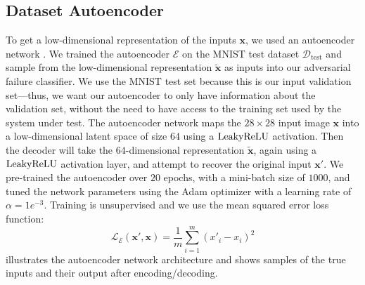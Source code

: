 \subsection{Dataset Autoencoder}\label{sec:autoencoder}
To get a low-dimensional representation of the inputs $\mathbf{x}$, we used an autoencoder network \citep{kramer1991nonlinear}.
We trained the autoencoder $\mathcal{E}$ on the MNIST test dataset $\mathcal{D}_\text{test}$ and sample from the low-dimensional representation $\tilde{\mathbf{x}}$ as inputs into our adversarial failure classifier.
We use the MNIST test set because this is our input validation set---thus, we want our autoencoder to only have information about the validation set, without the need to have access to the training set used by the system under test.
The autoencoder network maps the $28\times28$ input image $\mathbf x$ into a low-dimensional latent space of size $64$ using a $\operatorname{LeakyReLU}$ activation.
Then the decoder will take the $64$-dimensional representation $\mathbf{\tilde x}$, again using a $\operatorname{LeakyReLU}$ activation layer, and attempt to recover the original input $\mathbf x'$.
We pre-trained the autoencoder over $20$ epochs, with a mini-batch size of $1000$, and tuned the network parameters using the Adam optimizer with a learning rate of $\alpha=1e^{-3}$.
Training is unsupervised and we use the mean squared error loss function:
\begin{equation*}
\mathcal{L}_\mathcal{E}(\mathbf{x}', \mathbf{x}) = \frac{1}{m} \sum_{i=1}^m \left( x'_i - x_i \right)^2
\end{equation*}
 illustrates the autoencoder network architecture and  shows samples of the true inputs and their output after encoding/decoding.


